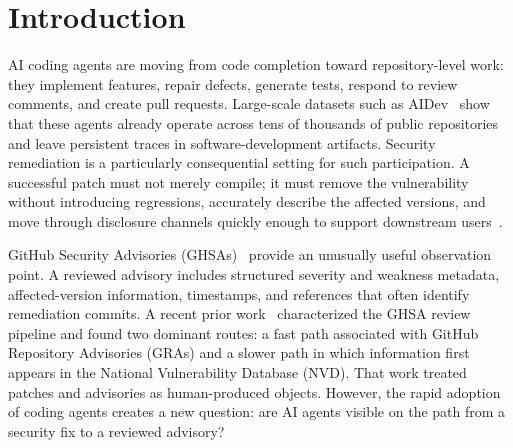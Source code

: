 \documentclass[smallextended,natbib]{svjour3}
\begin{document}
\begin{abstract}
\textbf{Conclusions.} Coding-agent involvement is already visible across hundreds of security advisories and repositories, including advisories addressing high- and critical-severity vulnerabilities. By distinguishing direct attribution from repository-level adoption, and route composition from within-route review timing, this study provides a clearer empirical picture of how agent-assisted remediation appears in the GHSA review pipeline.

 

\end{abstract}

\section{Introduction}
\label{sec:introduction}

AI coding agents are moving from code completion toward repository-level work:
they implement features, repair defects, generate tests, respond to review
comments, and create pull requests.  Large-scale datasets such as AIDev~\citep{li2025aidev} show
that these agents already operate across tens of thousands of public
repositories and leave persistent traces in software-development artifacts.  Security remediation is a particularly consequential
setting for such participation.  A successful patch must not merely compile;
it must remove the vulnerability without introducing regressions, accurately
describe the affected versions, and move through disclosure channels quickly
enough to support downstream users~\citep{siddiq2026securityageaiteammates}.

GitHub Security Advisories (GHSAs)~\citep{GitHubAdvisoryDatabase} provide an unusually useful observation
point.  A reviewed advisory includes structured severity and weakness
metadata, affected-version information, timestamps, and references that often
identify remediation commits. A recent prior work~\citep{segal2026ghsa} characterized the GHSA review
pipeline and found two dominant routes: a fast path associated with GitHub
Repository Advisories (GRAs) and a slower path in which information first
appears in the National Vulnerability Database (NVD).
That work treated patches and advisories as human-produced objects. However, the rapid
adoption of coding agents creates a new question: are AI agents visible
on the path from a security fix to a reviewed advisory?
\end{document}
